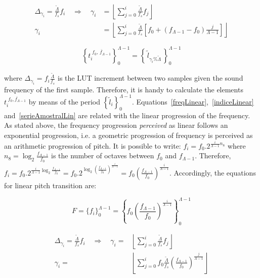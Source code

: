 \begin{equation}\label{indiceLinear}
\begin{split}
	\Delta_{\gamma_i}=\frac{\widetilde{\Lambda}}{f_s}f_i \quad \Rightarrow \quad \gamma_i & = \left \lfloor \sum_{j=0}^{i} \frac{\widetilde{\Lambda}}{f_s}f_j \right \rfloor \\
	\gamma_i & =  \left \lfloor \sum_{j=0}^{i} \frac{\widetilde{\Lambda}}{f_s} \left [f_0 + (f_{\Lambda-1}-f_0)\frac{j}{\Lambda-1} \right ] \right \rfloor 
\end{split}
\end{equation}

\begin{equation}\label{serieAmostralLin}
 \left\{t_i^{\;\overline{f_0,\, f_{\Lambda-1}}}\right\}_0^{\Lambda-1}=\left\{\,\widetilde{l}_{\gamma_i \% \widetilde{\Lambda}}\,\right\}_0^{\Lambda-1}
\end{equation}

\noindent where $\Delta_{\gamma_i}=f_i\frac{\widetilde{\Lambda}}{f_s}$ is the LUT increment between two samples given the sound frequency of the first sample. Therefore, it is handy to calculate the elements $t_i^{\;\overline{f_0,f_{\Lambda-1}}}$ by means of the period $\left\{\widetilde{l}_i\right\}_0^{\Lambda-1}$. Equations~\ref{freqLinear},~\ref{indiceLinear} and~\ref{serieAmostralLin} are related with the linear progression of the frequency. As stated above, the frequency progression \emph{perceived} as linear follows an exponential progression, i.e. a geometric progression of frequency is perceived as an arithmetic progression of pitch. It is possible to write: $f_i=f_0 . 2^{\frac{i}{\Lambda-1} n_8}$ where $n_8=\log_2\frac{f_{\Lambda-1}}{f_0}$ is the number of octaves between $f_0$ and $f_{\Lambda-1}$.
Therefore, $f_i=f_0 . 2^{\frac{i}{\Lambda-1}\log_2\frac{f_{\Lambda-1}}{f_0}}=
 f_0 . 2^{\log_2\left ( \frac{f_{\Lambda-1}}{f_0} \right )^{\frac{i}{\Lambda-1}}}=
 f_0 \left ( \frac{f_{\Lambda-1}}{f_0} \right ) ^{\frac{i}{\Lambda -1}}$. Accordingly, the equations for linear pitch transition are:

\begin{equation}\label{freqExponencial}
 F=\{f_i\}_0^{\Lambda-1}=  \left\{f_0 \left ( \frac{f_{\Lambda-1}}{f_0} \right ) ^{\frac{i}{\Lambda -1}} \right\}_0^{\Lambda-1}
\end{equation}

\begin{equation}\label{indiceExponencial}
\begin{split}
 \Delta_{\gamma_i}= \frac{\widetilde{\Lambda}}{f_s}f_i \quad \Rightarrow  \quad \gamma_i= & \left \lfloor \sum_{j=0}^{i} \frac{\widetilde{\Lambda}}{f_s}f_j \right \rfloor \\
	\gamma_i = & \left \lfloor \sum_{j=0}^{i} f_0 \frac{\widetilde{\Lambda}}{f_s} \left ( \frac{f_{\Lambda-1}}{f_0} \right ) ^{\frac{j}{\Lambda -1}} \right \rfloor
\end{split}
\end{equation}

